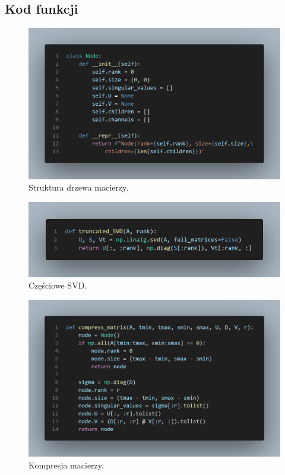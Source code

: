 \documentclass[11pt, leqno]{scrartcl}
\begin{document}
    \subsection{Kod funkcji}
    \begin{figure}[H]
        \centering
        \includegraphics[width=1\linewidth]{Node.png}
        \caption{Struktura drzewa macierzy.}
    \end{figure}
    \begin{figure}[H]
        \centering
        \includegraphics[width=1\linewidth]{truncated_SVD.png}
        \caption{Częściowe SVD.}
    \end{figure}
    \begin{figure}[H]
        \centering
        \includegraphics[width=1\linewidth]{compress_matrix.png}
        \caption{Kompresja macierzy.}
    \end{figure}
\end{document}
